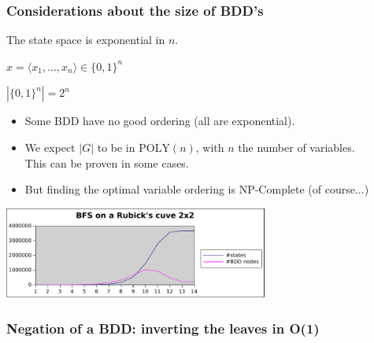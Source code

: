 \documentclass[10pt,a4paper,pdf]{beamer}
\renewcommand{\t}[1]{\text{#1}}
\begin{document}
\begin{frame}
\frametitle{Considerations about the size of BDD's}

The state space is exponential in $n$.

$x = \langle x_1, \ldots, x_n \rangle \in \{0,1\}^n$

$|\{0,1\}^n| = 2^n$

\begin{itemize}
\item Some BDD have no good ordering (all are exponential).
\item We expect $|G|$ to be in $\t{POLY}(n)$, with $n$ the number of variables.\\
This can be proven in some cases.
\pause
\item But finding the optimal variable ordering is NP-Complete (of course...)
\end{itemize}
\pause
\begin{center}
\includegraphics[height=3cm]{images/exponential.pdf}
\end{center}

\begin{center}

\end{center}

\end{frame}

\begin{frame}
\frametitle{Negation of a BDD: inverting the leaves in O(1)}
\begin{center}


\end{center}

\end{frame}
\end{document}
